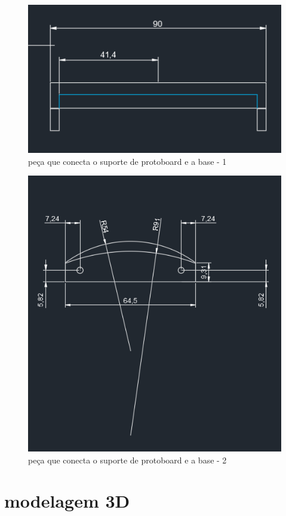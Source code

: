 \begin{figure}[h]
	\centering
	\includegraphics{figures/cad4}
	\caption{peça que conecta o suporte de protoboard e a base - 1}
	\label{fig:peca_juncao}
\end{figure}

\begin{figure}[h]
	\centering
	\includegraphics{figures/cad4_2}
	\caption{peça que conecta o suporte de protoboard e a base - 2}
	\label{fig:peca_juncao_2}
\end{figure}



\section{modelagem 3D}


